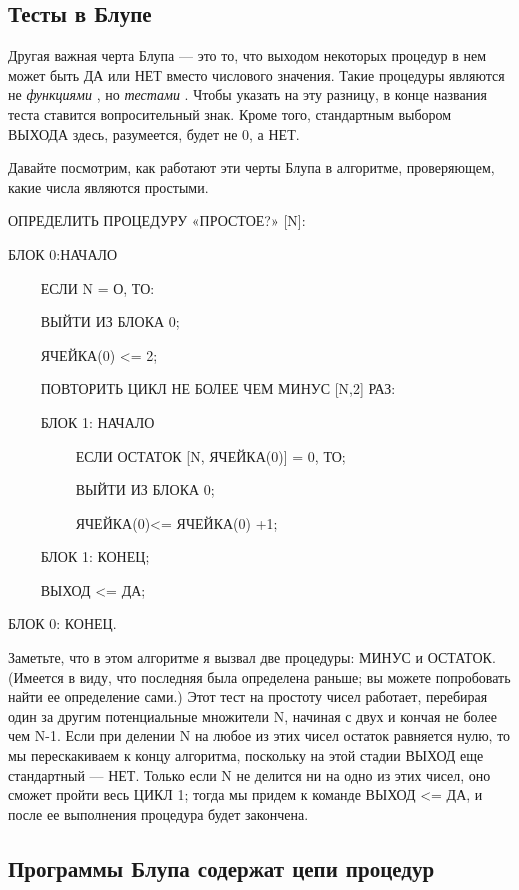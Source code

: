 \documentclass[../main.tex]{subfiles}
\begin{document}
\subsection{Тесты в Блупе}

Другая важная черта Блупа --- это то, что выходом некоторых процедур в нем может быть ДА или НЕТ вместо числового значения. Такие процедуры являются не \emph{функциями} , но \emph{тестами} . Чтобы указать на эту разницу, в конце названия теста ставится вопросительный знак. Кроме того, стандартным выбором ВЫХОДА здесь, разумеется, будет не 0, а НЕТ.

Давайте посмотрим, как работают эти черты Блупа в алгоритме, проверяющем, какие числа являются простыми.

ОПРЕДЕЛИТЬ ПРОЦЕДУРУ «ПРОСТОЕ?» {[}N{]}:

БЛОК 0:НАЧАЛО

~~~~ ЕСЛИ N = О, ТО:

~~~~ ВЫЙТИ ИЗ БЛОКА 0;

~~~~ ЯЧЕЙКА(0) \textless= 2;

~~~~ ПОВТОРИТЬ ЦИКЛ НЕ БОЛЕЕ ЧЕМ МИНУС {[}N,2{]} РАЗ:

~~~~ БЛОК 1: НАЧАЛО

~~~~~~~~~ ЕСЛИ ОСТАТОК {[}N, ЯЧЕЙКА(0){]} = 0, ТО;

~~~~~~~~~ ВЫЙТИ ИЗ БЛОКА 0;

~~~~~~~~~ ЯЧЕЙКА(0)\textless= ЯЧЕЙКА(0) +1;

~~~~ БЛОК 1: КОНЕЦ;

~~~~ ВЫХОД \textless= ДА;

БЛОК 0: КОНЕЦ.

Заметьте, что в этом алгоритме я вызвал две процедуры: МИНУС и ОСТАТОК. (Имеется в виду, что последняя была определена раньше; вы можете попробовать найти ее определение сами.) Этот тест на простоту чисел работает, перебирая один за другим потенциальные множители N, начиная с двух и кончая не более чем N-1. Если при делении N на любое из этих чисел остаток равняется нулю, то мы перескакиваем к концу алгоритма, поскольку на этой стадии ВЫХОД еще стандартный --- НЕТ. Только если N не делится ни на одно из этих чисел, оно сможет пройти весь ЦИКЛ 1; тогда мы придем к команде ВЫХОД \textless= ДА, и после ее выполнения процедура будет закончена.


\subsection{Программы Блупа содержат цепи процедур}
\end{document}
